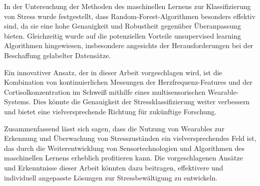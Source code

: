 In der Untersuchung der Methoden des maschinellen Lernens zur Klassifizierung von Stress wurde festgestellt, dass Random-Forest-Algorithmen besonders effektiv sind, da sie eine hohe Genauigkeit und Robustheit gegenüber Überanpassung bieten. Gleichzeitig wurde auf die potenziellen Vorteile unsupervised learning Algorithmen hingewiesen, insbesondere angesichts der Herausforderungen bei der Beschaffung gelabelter Datensätze.

Ein innovativer Ansatz, der in dieser Arbeit vorgeschlagen wird, ist die Kombination von kontinuierlichen Messungen der Herzfrequenz-Features und der Cortisolkonzentration im Schweiß mithilfe eines multisensorischen Wearable-Systems. Dies könnte die Genauigkeit der Stressklassifizierung weiter verbessern und bietet eine vielversprechende Richtung für zukünftige Forschung.

Zusammenfassend lässt sich sagen, dass die Nutzung von Wearables zur Erkennung und Überwachung von Stresszuständen ein vielversprechendes Feld ist, das durch die Weiterentwicklung von Sensortechnologien und Algorithmen des maschinellen Lernens erheblich profitieren kann. Die vorgeschlagenen Ansätze und Erkenntnisse dieser Arbeit könnten dazu beitragen, effektivere und individuell angepasste Lösungen zur Stressbewältigung zu entwickeln.
